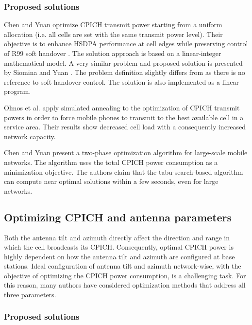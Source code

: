 \subsubsection{Proposed solutions}

Chen and Yuan \cite{CPICH.optimization:2008} optimize CPICH transmit
power starting from a uniform allocation (i.e. all cells are set with
the same transmit power level). Their objective is to enhance HSDPA
performance at cell edges while preserving control of R99 soft handover
\cite{wiki:soft_handover}. The solution approach is based on a linear-integer
mathematical model. A very similar problem and proposed solution is
presented by Siomina and Yuan \cite{CPICH.optimization:2007}. The
problem definition slightly differs from \cite{CPICH.optimization:2008}
as there is no reference to soft handover control. The solution is
also implemented as a linear program.

Olmos et al. \cite{CPICH.optimization:2003} apply simulated annealing
to the optimization of CPICH transmit powers in order to force mobile
phones to transmit to the best available cell in a service area. Their
results show decreased cell load with a consequently increased network
capacity.

Chen and Yuan \cite{CPICH.optimization:2009} present a two-phase
optimization algorithm for large-scale mobile networks. The algorithm
uses the total CPICH power consumption as a minimization objective.
The authors claim that the tabu-search-based algorithm can compute
near optimal solutions within a few seconds, even for large networks.


\subsection{Optimizing CPICH and antenna parameters}

Both the antenna tilt and azimuth directly affect the direction and
range in which the cell broadcasts its CPICH. Consequently, optimal
CPICH power is highly dependent on how the antenna tilt and azimuth
are configured at base stations. Ideal configuration of antenna tilt
and azimuth network-wise, with the objective of optimizing the CPICH
power consumption, is a challenging task. For this reason, many authors
have considered optimization methods that address all three parameters.


\subsubsection{Proposed solutions}

